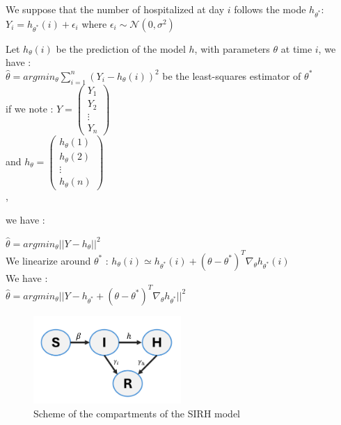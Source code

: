 \documentclass[12pt,a4paper]{report}
\begin{document}
We suppose that the number of hospitalized at day $i$ follows the mode $h_{\theta^*}$: 
$ Y_i = h_{\theta^*}(i) + \epsilon_i$ where $\epsilon_i \sim \mathcal{N}(0, \sigma^2)$

Let $h_{\theta}(i)$ be the prediction of the model $h$, with parameters $\theta$ at time $i$, we have : \\
$ \hat{\theta} = argmin_{\theta} \sum_{i=1}^{n} (Y_i - h_{\theta}(i))^2$ be the least-squares estimator of $\theta^*$ \\



if we note : 
 $Y = 
\begin{pmatrix}
    Y_1 \\
    Y_2 \\
    \vdots \\
    Y_n
\end{pmatrix} $ \\[0.2cm]

and $h_{\theta} =
\begin{pmatrix}
    h_{\theta}(1) \\
    h_{\theta}(2) \\
    \vdots \\
    h_{\theta}(n)
\end{pmatrix} $ \\[0.2cm], 

we have : 

$\hat{\theta} = argmin_{\theta} ||Y - h_{\theta}||^2$ \\

We linearize around $\theta^*$ :
$h_{\theta}(i) \simeq h_{\theta^*}(i) +  (\theta - \theta^*)^T\nabla_{\theta} h_{\theta^*}(i)$ \\

We have :\\
$\hat{\theta} = argmin_{\theta} ||Y - h_{\theta^*} +  (\theta - \theta^*)^T\nabla_{\theta} h_{\theta^*}||^2$ \\







\begin{figure}
    \centering
    \includegraphics[width=0.5\textwidth]{SIRH_model.png}
    \caption{Scheme of the compartments of the SIRH model}
    \label{fig:sirh}
\end{figure}
\end{document}
